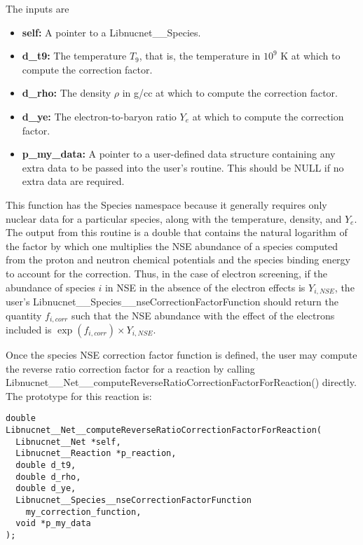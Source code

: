 \documentclass{article}    %
\begin{document}
The inputs are
\begin{itemize}

\item {\bf self:}  A pointer to a Libnucnet\_\_Species.

\item {\bf d\_t9:}  The temperature $T_9$, that is, the temperature
in $10^9$ K at which to compute the correction factor.

\item {\bf d\_rho:}  The density $\rho$ in g/cc at which to compute
the correction factor.

\item {\bf d\_ye:}  The electron-to-baryon ratio $Y_e$ at which to compute
the correction factor.

\item {\bf p\_my\_data:}  A pointer to a user-defined data structure
containing any extra data to be passed into the user's routine.  This should
be NULL if no extra data are required.

\end{itemize}

This function has the Species namespace because it generally
requires only nuclear data for a particular species, along with the temperature,
density, and $Y_e$.  The output from this
routine is a double that contains the natural logarithm of the
factor by which one multiplies the
NSE abundance of a species computed from the proton and neutron
chemical potentials and the species binding energy
to account for the correction.  Thus, in
the case of electron screening, if the
abundance of species $i$ in NSE in the absence of the electron effects is
$Y_{i,NSE}$, the user's
Libnucnet\_\_Species\_\_nseCorrectionFactorFunction
should return
the quantity $f_{i,corr}$ such that the NSE abundance with the effect of the
electrons included is $\exp(f_{i,corr}) \times Y_{i,NSE}$.

Once the species NSE correction factor function is defined,
the user may compute the reverse ratio correction factor for a
reaction by calling
Libnucnet\_\_Net\_\_computeReverseRatioCorrectionFactorForReaction()
directly.  The prototype for this reaction is:

\begin{verbatim}
double
Libnucnet__Net__computeReverseRatioCorrectionFactorForReaction(
  Libnucnet__Net *self,
  Libnucnet__Reaction *p_reaction,
  double d_t9,
  double d_rho,
  double d_ye,
  Libnucnet__Species__nseCorrectionFactorFunction
    my_correction_function,
  void *p_my_data
);
\end{verbatim}
\end{document}
